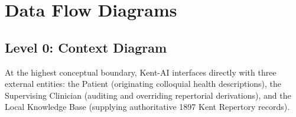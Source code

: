 
\section{Data Flow Diagrams}

\subsection{Level 0: Context Diagram}
At the highest conceptual boundary, Kent-AI interfaces directly with three external entities: the Patient (originating colloquial health descriptions), the Supervising Clinician (auditing and overriding repertorial derivations), and the Local Knowledge Base (supplying authoritative 1897 Kent Repertory records).

